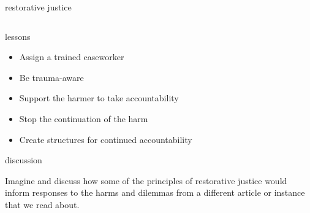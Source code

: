 \documentclass[aspectratio=169,17pt]{beamer} %
\begin{document}
\begin{frame}{restorative justice}
\begin{columns}
\begin{column}{0.7\textwidth}

    \end{column}
    \end{columns}


\end{frame}


\begin{frame}{lessons}
    
\begin{itemize}
    \item Assign a trained caseworker
    \item Be trauma-aware
    \item Support the harmer to take accountability
    \item Stop the continuation of the harm
    \item Create structures for continued accountability
\end{itemize}

\end{frame}


\begin{frame}{discussion}
    
Imagine and discuss how some of the principles of \alert{restorative justice} would inform responses to the harms and dilemmas from a different article or instance that we read about.

\end{frame}
\end{document}
